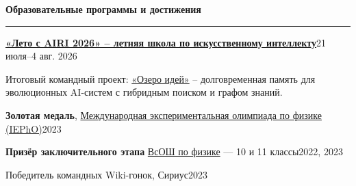 \documentclass[10pt,a4paper]{article}
\newcommand{\sectiontitle}[1]{%
  \vspace{0.38em}%
  {\normalsize\bfseries\color{accent} #1}\par
  \vspace{0.08em}\hrule\vspace{0.21em}%
}
\newcommand{\entry}[4]{%
  \textbf{#1}\hfill {\color{textgray}#2}\par
  {\color{textgray}#3}\par
  #4\vspace{0.21em}%
}
\newcommand{\achievement}[2]{%
  #1\hfill{\color{textgray}#2}\par
}
\begin{document}
\sectiontitle{Образовательные программы и достижения}
\entry{\href{https://airi.net/ru/summer-school-2026/}{«Лето с AIRI 2026» -- летняя школа по искусственному интеллекту}}{21 июля--4 авг. 2026}{Итоговый командный проект: \href{https://github.com/n4rly-boop/ideas-lake}{«Озеро идей»} -- долговременная память для эволюционных AI-систем с гибридным поиском и графом знаний.}{}
\achievement{\textbf{Золотая медаль}, \href{https://iepho.ru/}{Международная экспериментальная олимпиада по физике (IEPhO)}}{2023}
\achievement{\textbf{Призёр заключительного этапа} \href{https://vos.olimpiada.ru/}{ВсОШ по физике} — 10 и 11 классы}{2022, 2023}
\achievement{Победитель командных Wiki-гонок, Сириус}{2023}
\end{document}
